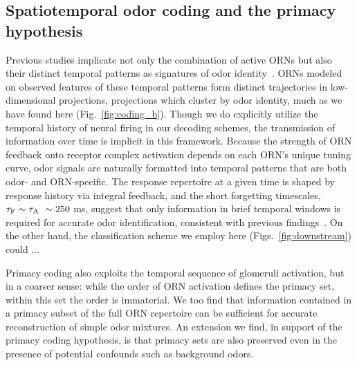 


\subsection{Spatiotemporal odor coding and the primacy hypothesis}

Previous studies implicate not only the combination of active ORNs but also their distinct temporal patterns as signatures of odor identity~\cite{stopfer_temporal_model, multiple_timescales_stopfer, stopfer_nat_neuro, stopfer_temporal_channel}. ORNs modeled on observed features of these temporal patterns form distinct trajectories in low-dimensional projections, projections which cluster by odor identity, much as we have found here (Fig.~\ref{fig:coding_b}). Though we do explicitly utilize the temporal history of neural firing in our decoding schemes, the transmission of information over time is implicit in this framework. Because the strength of ORN feedback onto receptor complex activation
depends on each ORN's unique tuning curve, odor signals are naturally formatted into temporal patterns that are both odor- and ORN-specific. The response repertoire at a given time is shaped by response history via integral feedback, and the short forgetting timescales, $\tau_{\textup F} \sim \tau_{\textup A} ~ \sim 250$ ms, suggest that only information in brief temporal windows is required for accurate odor identification, consistent with previous findings~\cite{stopfer_nat_neuro}. On the other hand, the classification scheme we employ here (Figs.~\ref{fig:downstream}) could ...



Primacy coding also exploits the temporal sequence of glomeruli activation, but in a coarser sense: while the order of ORN activation defines the primacy set, within this set the order is immaterial. We too find that information contained in a primacy subset of the full ORN repertoire can be sufficient for accurate reconstruction of simple odor mixtures. An extension we find, in support of the primacy coding hypothesis, is that primacy sets are also preserved even in the presence of potential confounds such as background odors. 




